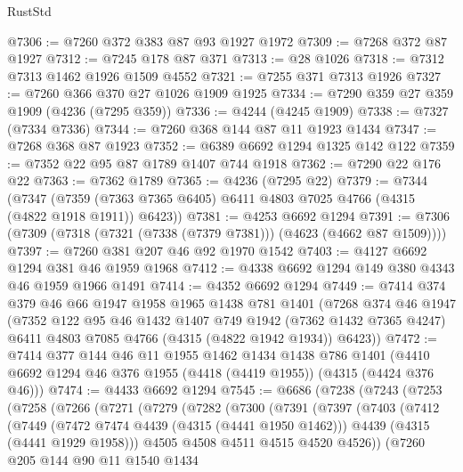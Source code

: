\begin{lexlean}{RustStd}
\begin{coremodule}
@7306 := @7260 @372 @383 @87 @93 @1927 @1972
@7309 := @7268 @372 @87 @1927
@7312 := @7245 @178 @87 @371
@7313 := @28 @1026
@7318 := @7312 @7313 @1462 @1926 @1509 @4552
@7321 := @7255 @371 @7313 @1926
@7327 := @7260 @366 @370 @27 @1026 @1909 @1925
@7334 := @7290 @359 @27 @359 @1909 (@4236 (@7295 @359))
@7336 := @4244 (@4245 @1909)
@7338 := @7327 (@7334 @7336)
@7344 := @7260 @368 @144 @87 @11 @1923 @1434
@7347 := @7268 @368 @87 @1923
@7352 := @6389 @6692 @1294 @1325 @142 @122
@7359 := @7352 @22 @95 @87 @1789 @1407 @744 @1918
@7362 := @7290 @22 @176 @22
@7363 := @7362 @1789
@7365 := @4236 (@7295 @22)
@7379 := @7344
    (@7347 (@7359 (@7363 @7365 @6405) @6411 @4803 @7025 @4766 (@4315 (@4822 @1918 @1911)) @6423))
@7381 := @4253 @6692 @1294
@7391 := @7306 (@7309 (@7318 (@7321 (@7338 (@7379 @7381))) (@4623 (@4662 @87 @1509))))
@7397 := @7260 @381 @207 @46 @92 @1970 @1542
@7403 := @4127 @6692 @1294 @381 @46 @1959 @1968
@7412 := @4338 @6692 @1294 @149 @380 @4343 @46 @1959 @1966 @1491
@7414 := @4352 @6692 @1294
@7449 := @7414
    @374
    @379
    @46
    @66
    @1947
    @1958
    @1965
    @1438
    @781
    @1401
    (@7268
      @374
      @46
      @1947
      (@7352
        @122
        @95
        @46
        @1432
        @1407
        @749
        @1942
        (@7362 @1432 @7365 @4247)
        @6411
        @4803
        @7085
        @4766
        (@4315 (@4822 @1942 @1934))
        @6423))
@7472 := @7414
    @377
    @144
    @46
    @11
    @1955
    @1462
    @1434
    @1438
    @786
    @1401
    (@4410 @6692 @1294 @46 @376 @1955 (@4418 (@4419 @1955)) (@4315 (@4424 @376 @46)))
@7474 := @4433 @6692 @1294
@7545 := @6686
    (@7238
      (@7243
        (@7253
          (@7258
            (@7266
              (@7271
                (@7279
                  (@7282
                    (@7300
                      (@7391
                        (@7397
                          (@7403
                            (@7412
                              (@7449
                                (@7472 @7474 @4439 (@4315 (@4441 @1950 @1462)))
                                @4439
                                (@4315 (@4441 @1929 @1958)))
                              @4505
                              @4508
                              @4511
                              @4515
                              @4520
                              @4526))
                          (@7260
                            @205
                            @144
                            @90
                            @11
                            @1540
                            @1434

\end{coremodule}
\end{lexlean}

